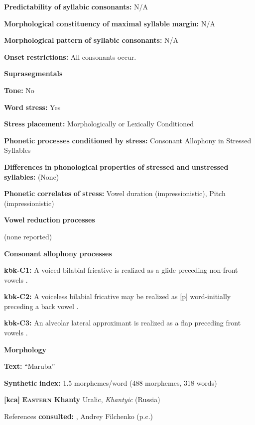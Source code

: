 \begin{styleBody}
\textbf{Predictability} \textbf{of} \textbf{syllabic} \textbf{consonants:} N/A

\textbf{Morphological} \textbf{constituency} \textbf{of} \textbf{maximal} \textbf{syllable} \textbf{margin:} N/A

\textbf{Morphological} \textbf{pattern} \textbf{of} \textbf{syllabic} \textbf{consonants:} N/A

\textbf{Onset} \textbf{restrictions:} All consonants occur.

\textbf{Suprasegmentals}

\textbf{Tone:} No

\textbf{Word} \textbf{stress:} Yes

\textbf{Stress} \textbf{placement:} Morphologically or Lexically Conditioned

\textbf{Phonetic} \textbf{processes} \textbf{conditioned} \textbf{by} \textbf{stress:} Consonant Allophony in Stressed Syllables

\textbf{Differences} \textbf{in} \textbf{phonological} \textbf{properties} \textbf{of} \textbf{stressed} \textbf{and} \textbf{unstressed} \textbf{syllables:} (None) 

\textbf{Phonetic} \textbf{correlates} \textbf{of} \textbf{stress:} Vowel duration (impressionistic), Pitch (impressionistic)

\textbf{Vowel} \textbf{reduction} \textbf{processes}

(none reported)

\textbf{Consonant} \textbf{allophony} \textbf{processes}

\textbf{kbk-C1:} A voiced bilabial fricative is realized as a glide preceding non-front vowels \citep{Dutton1996}.

\textbf{kbk-C2:} A voiceless bilabial fricative may be realized as [p] word-initially preceding a back vowel \citep{Dutton1996}.

\textbf{kbk-C3:} An alveolar lateral approximant is realized as a flap preceding front vowels \citep{Dutton1996}.

\textbf{Morphology}

\textbf{Text:} “Maruba” \citep[72-76]{Dutton1996}

\textbf{Synthetic} \textbf{index:} 1.5 morphemes/word (488 morphemes, 318 words)

\textbf{[kca]}   \textbf{\textsc{Eastern} \textbf{Khanty}}  Uralic, \textit{Khantyic} (Russia)

References \textbf{consulted:} \citet{Filchenko2007}, Andrey Filchenko (p.c.)


\end{styleBody}
